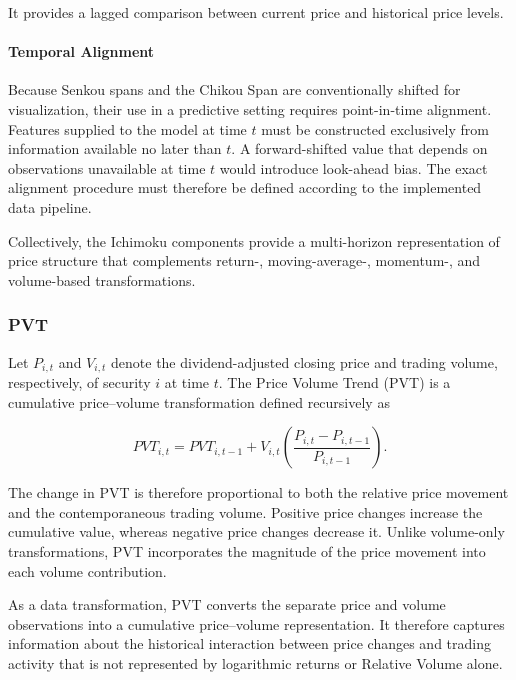 It provides a lagged comparison between current price and historical price levels.

\paragraph{Temporal Alignment}

Because Senkou spans and the Chikou Span are conventionally shifted for visualization, their use in a predictive setting requires point-in-time alignment. Features supplied to the model at time $t$ must be constructed exclusively from information available no later than $t$. A forward-shifted value that depends on observations unavailable at time $t$ would introduce look-ahead bias. The exact alignment procedure must therefore be defined according to the implemented data pipeline.

Collectively, the Ichimoku components provide a multi-horizon representation of price structure that complements return-, moving-average-, momentum-, and volume-based transformations.

\subsubsection{\acf{PVT}}

Let $P_{i,t}$ and $V_{i,t}$ denote the dividend-adjusted closing price and trading volume, respectively, of security $i$ at time $t$. The Price Volume Trend (PVT) is a cumulative price--volume transformation defined recursively as

\begin{equation}
    PVT_{i,t}
    =
    PVT_{i,t-1}
    +
    V_{i,t}
    \left(
    \frac{P_{i,t}-P_{i,t-1}}{P_{i,t-1}}
    \right).
\end{equation}

The change in PVT is therefore proportional to both the relative price movement and the contemporaneous trading volume. Positive price changes increase the cumulative value, whereas negative price changes decrease it. Unlike volume-only transformations, PVT incorporates the magnitude of the price movement into each volume contribution.

\medskip

As a data transformation, PVT converts the separate price and volume observations into a cumulative price--volume representation. It therefore captures information about the historical interaction between price changes and trading activity that is not represented by logarithmic returns or Relative Volume alone.

